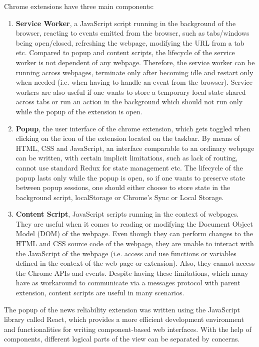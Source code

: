   Chrome extensions have three main components:
  \begin{enumerate}
    \item \textbf{Service Worker}, a JavaScript script running in the background of the browser, reacting to events emitted from the browser, such as tabs/windows being open/closed, refreshing the webpage, modifying the URL from a tab etc. Compared to popup and content scripts, the lifecycle of the service worker is not dependent of any webpage. Therefore, the service worker can be running across webpages, terminate only after becoming idle and restart only when needed (i.e. when having to handle an event from the browser). Service workers are also useful if one wants to store a temporary local state shared across tabs or run an action in the background which should not run only while the popup of the extension is open.
    \item \textbf{Popup}, the user interface of the chrome extension, which gets toggled when clicking on the icon of the extension located on the taskbar. By means of HTML, CSS and JavaScript, an interface comparable to an ordinary webpage can be written, with certain implicit limitations, such as lack of routing, cannot use standard Redux for state management etc. The lifecycle of the popup lasts only while the popup is open, so if one wants to preserve state between popup sessions, one should either choose to store state in the background script, localStorage or Chrome's Sync or Local Storage.
    \item \textbf{Content Script}, JavaScript scripts running in the context of webpages. They are useful when it comes to reading or modifying the Document Object Model (DOM) of the webpage. Even though they can perform changes to the HTML and CSS source code of the webpage, they are unable to interact with the JavaScript of the webpage (i.e. access and use functions or variables defined in the context of the web page or extension). Also, they cannot access the Chrome APIs and events. Despite having these limitations, which many have as workaround to communicate via a messages protocol with parent extension, content scripts are useful in many scenarios.
  \end{enumerate}

  The popup of the news reliability extension was written using the JavaScript library called React, which provides a more efficient development environment and functionalities for writing component-based web interfaces. With the help of components, different logical parts of the view can be separated by concerns.

